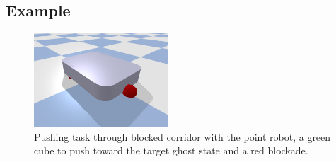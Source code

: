 %





\subsection{Example}%
\label{subsec:hgraph_example}

\begin{figure}[H]
    \centering
    \includegraphics[width=5cm]{figures/boxer_robot.png}
    \caption{Pushing task through blocked corridor with the point robot, a green cube to push toward the target ghost state and a red blockade.}%
\label{fig:blocked_path_example_environment}
\end{figure}

